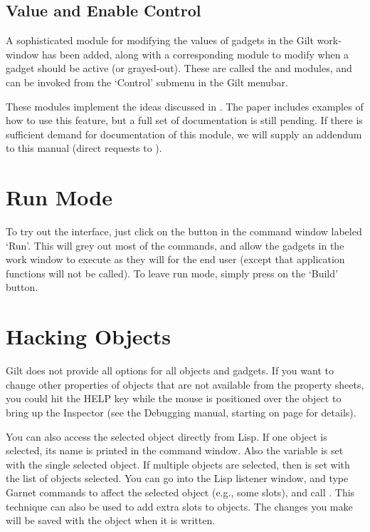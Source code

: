 \subsection{Value and Enable Control}

A sophisticated module for modifying the values of gadgets in the Gilt
work-window has been added, along with a corresponding module to modify
when a gadget should be active (or grayed-out).  These are called
the  and  modules, and can be invoked
from the `Control' submenu in the Gilt menubar.

These modules implement the ideas discussed in \cite{GiltDemo}.
The paper includes examples of how to use this feature, but
a full set of documentation is still pending.  If there is sufficient demand
for documentation of this module, we will supply an addendum to this manual
(direct requests to ).


\section{Run Mode}


To try out the interface, just click on the button in the command
window labeled `Run'.  This will grey out most of the commands, and
allow the gadgets in the work window to execute as they will for the
end user (except that application functions will not be called).  To
leave run mode, simply press on the `Build' button.


\section{Hacking Objects}

Gilt does not provide all options for all objects and gadgets.  If you
want to change other properties of objects that are not available from
the property sheets, you could hit the HELP key while the mouse is positioned
over the object to bring up the Inspector (see the Debugging manual, starting
on page \value{debug} for details).

You can also access the selected object directly from
Lisp.  If one object is selected, its name is printed in the command
window.  Also the variable  is set with the single
selected object.  If multiple objects are selected, then
 is set with the list of objects selected.
You can go into the Lisp listener window, and type
Garnet commands to affect the selected object (e.g.,  some
slots), and call .  This
technique can also be used to add extra slots to objects.  The
changes you make will be saved with the object when it is written.



